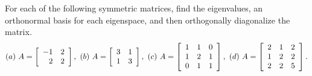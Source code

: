 \documentclass{ximera}
\author{Zack Reed}
\begin{document}
\begin{exercise}
  For each of the following symmetric matrices, find the eigenvalues,
  an orthonormal basis for each eigenspace, and then orthogonally
  diagonalize the matrix.
  \begin{equation*}
    (a)\quad
    A = \startmat{rr}
      -1 & 2 \\
      2  & 2 \\
    \stopmat,\quad
    (b)\quad
    A = \startmat{rr}
      3 & 1 \\
      1 & 3 \\
    \stopmat,\quad
    (c)\quad
    A = \startmat{rrr}
      1 & 1 & 0 \\
      1 & 2 & 1 \\
      0 & 1 & 1 \\
    \stopmat,\quad
    (d)\quad
    A = \startmat{rrr}
      2 & 1 & 2 \\
      1 & 2 & 2 \\
      2 & 2 & 5 \\
    \stopmat.
  \end{equation*}
  \begin{solution}
\end{solution}
\end{exercise}
\end{document}
